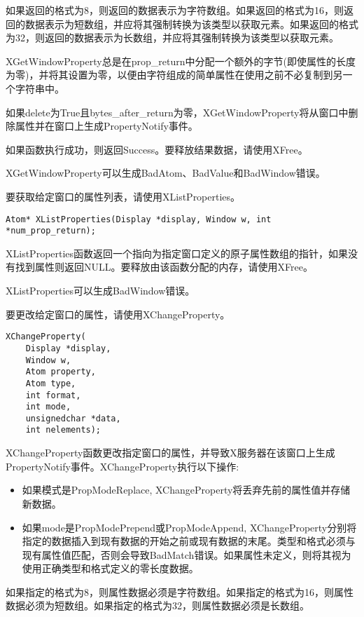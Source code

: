 如果返回的格式为8，则返回的数据表示为字符数组。如果返回的格式为16，则返回的数据表示为短数组，并应将其强制转换为该类型以获取元素。如果返回的格式为32，则返回的数据表示为长数组，并应将其强制转换为该类型以获取元素。

XGetWindowProperty总是在prop\_return中分配一个额外的字节(即使属性的长度为零)，并将其设置为零，以便由字符组成的简单属性在使用之前不必复制到另一个字符串中。

如果delete为True且bytes\_after\_return为零，XGetWindowProperty将从窗口中删除属性并在窗口上生成PropertyNotify事件。

如果函数执行成功，则返回Success。要释放结果数据，请使用XFree。

XGetWindowProperty可以生成BadAtom、BadValue和BadWindow错误。

要获取给定窗口的属性列表，请使用XListProperties。

\begin{lstlisting}
Atom* XListProperties(Display *display, Window w, int *num_prop_return);
\end{lstlisting}

XListProperties函数返回一个指向为指定窗口定义的原子属性数组的指针，如果没有找到属性则返回NULL。要释放由该函数分配的内存，请使用XFree。

XListProperties可以生成BadWindow错误。

要更改给定窗口的属性，请使用XChangeProperty。

\begin{lstlisting}
XChangeProperty(
	Display *display,
	Window w,
	Atom property,
	Atom type,
	int format,
	int mode,
	unsignedchar *data,
	int nelements);
\end{lstlisting}

XChangeProperty函数更改指定窗口的属性，并导致X服务器在该窗口上生成PropertyNotify事件。XChangeProperty执行以下操作:

\begin{itemize}
	\item 如果模式是PropModeReplace, XChangeProperty将丢弃先前的属性值并存储新数据。
	\item 如果mode是PropModePrepend或PropModeAppend, XChangeProperty分别将指定的数据插入到现有数据的开始之前或现有数据的末尾。类型和格式必须与现有属性值匹配，否则会导致BadMatch错误。如果属性未定义，则将其视为使用正确类型和格式定义的零长度数据。
\end{itemize}

如果指定的格式为8，则属性数据必须是字符数组。如果指定的格式为16，则属性数据必须为短数组。如果指定的格式为32，则属性数据必须是长数组。

